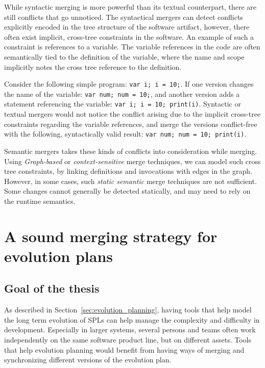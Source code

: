 \documentclass[a4paper,english]{ifimaster}
\begin{document}
While syntactic merging is more powerful than its textual counterpart, there are still conflicts that go unnoticed. The syntactical mergers can detect conflicts explicitly encoded in the tree structure of the software artifact, however, there often exist implicit, cross-tree constraints in the software. An example of such a constraint is references to a variable. The variable references in the code are often semantically tied to the definition of the variable, where the name and scope implicitly notes the cross tree reference to the definition.

Consider the following simple program: \texttt{var i; i = 10;}. If one version changes the name of the variable: \texttt{var num; num = 10;}, and another version adds a statement referencing the variable: \texttt{var i; i = 10; print(i)}. Syntactic or textual mergers would not notice the conflict arising due to the implicit cross-tree constraints regarding the variable references, and merge the versions conflict-free with the following, syntactically valid result: \texttt{var num; num = 10; print(i)}.

Semantic mergers takes these kinds of conflicts into consideration while merging. Using \textit{Graph-based}  or \textit{context-sensitive} merge techniques, we can model such cross tree constraints, by linking definitions and invocations with edges in the graph. However, in some cases, such \textit{static semantic} merge techniques are not sufficient. Some changes cannot generally be detected statically, and may need to rely on the runtime semantics.

\chapter{A sound merging strategy for evolution plans}%
\label{cha:solution}

\section{Goal of the thesis}%
\label{sec:goal_of_the_thesis}

As described in Section~\ref{sec:evolution_planning}, having tools that help model the long term evolution of SPLs can help manage the complexity and difficulty in development. Especially in larger systems, several persons and teams often work independently on the same software product line, but on different assets. Tools that help evolution planning would benefit from having ways of merging and synchronizing different versions of the evolution plan.
\end{document}
